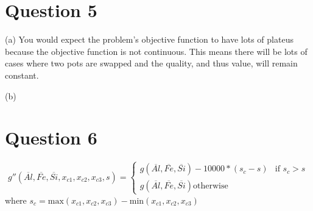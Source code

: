 \documentclass{article}
\begin{document}
\section{Question 5}
(a) You would expect the problem's objective function to have lots of 
plateus because the objective function is not continuous. This means
there will be lots of cases where two pots are swapped and the
quality, and thus value, will remain constant.

(b) 

\section{Question 6}
$$g''(\overline{Al}, \overline{Fe}, \overline{Si}, x_{c1}, x_{c2}, 
x_{c3}, s) =
\begin{cases}
    g(\overline{Al}, \overline{Fe}, \overline{Si}) - 10000*(s_c - s) & \text{if } s_c > s \\
    g(\overline{Al}, \overline{Fe}, \overline{Si}) \text{otherwise}
\end{cases}$$ where
$s_c = \text{max}(x_{c1}, x_{c2}, x_{c3}) - \text{min}(x_{c1}, x_{c2}, x_{c3})$
\end{document}

